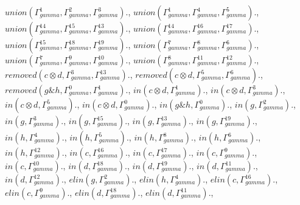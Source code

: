\documentclass[a4paper, 11pt]{article}
\begin{document}
$union(\Gamma_{gamma}^{1}, \Gamma_{gamma}^{2}, \Gamma_{gamma}^{3}).$, $union(\Gamma_{gamma}^{1}, \Gamma_{gamma}^{4}, \Gamma_{gamma}^{5}).$, $union(\Gamma_{gamma}^{14}, \Gamma_{gamma}^{15}, \Gamma_{gamma}^{13}).$, $union(\Gamma_{gamma}^{14}, \Gamma_{gamma}^{16}, \Gamma_{gamma}^{17}).$, $union(\Gamma_{gamma}^{15}, \Gamma_{gamma}^{18}, \Gamma_{gamma}^{19}).$, $union(\Gamma_{gamma}^{7}, \Gamma_{gamma}^{8}, \Gamma_{gamma}^{6}).$, $union(\Gamma_{gamma}^{7}, \Gamma_{gamma}^{9}, \Gamma_{gamma}^{10}).$, $union(\Gamma_{gamma}^{8}, \Gamma_{gamma}^{11}, \Gamma_{gamma}^{12}).$, $removed(c \otimes d, \Gamma_{gamma}^{3}, \Gamma_{gamma}^{13}).$, $removed(c \otimes d, \Gamma_{gamma}^{5}, \Gamma_{gamma}^{6}).$, $removed(g \binampersand h, \Gamma_{gamma}^{0}, \Gamma_{gamma}^{1}).$, $in(c \otimes d, \Gamma_{gamma}^{1}).$, $in(c \otimes d, \Gamma_{gamma}^{3}).$, $in(c \otimes d, \Gamma_{gamma}^{5}).$, $in(c \otimes d, \Gamma_{gamma}^{0}).$, $in(g \binampersand h, \Gamma_{gamma}^{0}).$, $in(g, \Gamma_{gamma}^{2}).$, $in(g, \Gamma_{gamma}^{3}).$, $in(g, \Gamma_{gamma}^{15}).$, $in(g, \Gamma_{gamma}^{13}).$, $in(g, \Gamma_{gamma}^{19}).$, $in(h, \Gamma_{gamma}^{4}).$, $in(h, \Gamma_{gamma}^{5}).$, $in(h, \Gamma_{gamma}^{8}).$, $in(h, \Gamma_{gamma}^{6}).$, $in(h, \Gamma_{gamma}^{12}).$, $in(c, \Gamma_{gamma}^{16}).$, $in(c, \Gamma_{gamma}^{17}).$, $in(c, \Gamma_{gamma}^{9}).$, $in(c, \Gamma_{gamma}^{10}).$, $in(d, \Gamma_{gamma}^{18}).$, $in(d, \Gamma_{gamma}^{19}).$, $in(d, \Gamma_{gamma}^{11}).$, $in(d, \Gamma_{gamma}^{12}).$, $elin(g, \Gamma_{gamma}^{2}).$, $elin(h, \Gamma_{gamma}^{4}).$, $elin(c, \Gamma_{gamma}^{16}).$, $elin(c, \Gamma_{gamma}^{9}).$, $elin(d, \Gamma_{gamma}^{18}).$, $elin(d, \Gamma_{gamma}^{11}).$, 
\end{document}
